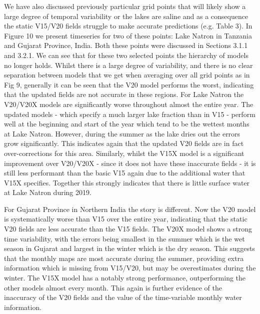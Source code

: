 \documentclass[hess, manuscript]{copernicus}
\begin{document}
We have also discussed previously particular grid points that will likely show a large degree of temporal variability or the lakes are saline and as a consequence the static V15/V20 fields struggle to make accurate predictions (e.g. Table 3). In Figure 10 we present timeseries for two of these points: Lake Natron in Tanzania and Gujarat Province, India. Both these points were discussed in Sections 3.1.1 and 3.2.1. We can see that for these two selected points the hierarchy of models no longer holds. Whilst there is a large degree of variability, and there is no clear separation between models that we get when averaging over all grid points as in Fig 9, generally it can be seen that the V20 model performs the worst, indicating that the updated fields are not accurate in these regions. For Lake Natron the V20/V20X models are significantly worse throughout almost the entire year. The updated models - which specify a much larger lake fraction than in V15 - perform well at the beginning and start of the year which tend to be the wettest months at Lake Natron. However, during the summer as the lake dries out the errors grow significantly. This indicates again that the updated V20 fields are in fact over-corrections for this area. Similarly, whilst the V15X model is a significant improvement over V20/V20X - since it does not have these inaccurate fields - it is still less performant than the basic V15 again due to the additional water that V15X specifies. Together this strongly indicates that there is little surface water at Lake Natron during 2019.

For Gujarat Province in Northern India the story is different. Now the V20 model is systematically worse than V15 over the entire year, indicating that the static V20 fields are less accurate than the V15 fields. The V20X model shows a strong time variability, with the errors being smallest in the summer which is the wet season in Gujarat and largest in the winter which is the dry season. This suggests that the monthly maps are most accurate during the summer, providing extra information which is missing from V15/V20, but may be overestimates during the winter. The V15X model has a notably strong performance, outperforming the other models almost every month. This again is further evidence of the inaccuracy of the V20 fields and the value of the time-variable monthly water information.
\end{document}
